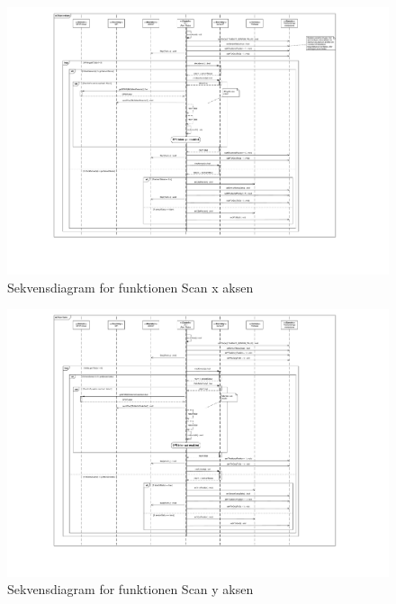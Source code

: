 \begin{figure}[H]
	\caption{Sekvensdiagram for funktionen Scan x aksen}
	\label{SD:PSoC:ScanX}
	\includegraphics[scale=0.29,trim=200 150 0 0, clip]{APPSoC/SD-Scan-x-aksen}
\end{figure}

\begin{figure}[H]
	\caption{Sekvensdiagram for funktionen Scan y aksen}
	\label{SD:PSoC:ScanX}
	\includegraphics[scale=0.29,trim=200 100 0 0,clip]{APPSoC/SD-Scan-y-aksen}
\end{figure}

